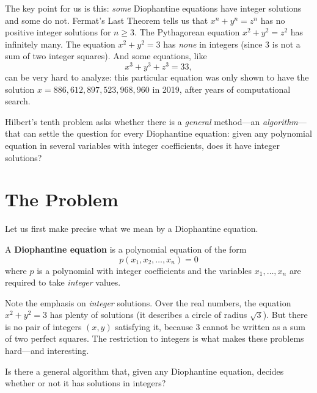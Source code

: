 The key point for us is this: \emph{some} Diophantine equations have integer solutions and some do not. Fermat's Last Theorem tells us that $x^n + y^n = z^n$ has no positive integer solutions for $n \geq 3$. The Pythagorean equation $x^2 + y^2 = z^2$ has infinitely many. The equation $x^2 + y^2 = 3$ has \emph{none} in integers (since $3$ is not a sum of two integer squares). And some equations, like
\[
    x^3 + y^3 + z^3 = 33,
\]
can be very hard to analyze: this particular equation was only shown to have the solution $x = 886{,}612{,}897{,}523{,}968{,}960$ in 2019, after years of computational search.

Hilbert's tenth problem asks whether there is a \emph{general} method---an \emph{algorithm}---that can settle the question for every Diophantine equation: given any polynomial equation in several variables with integer coefficients, does it have integer solutions?

\section{The Problem}

Let us first make precise what we mean by a Diophantine equation.

\begin{definition}
A \textbf{Diophantine equation} is a polynomial equation of the form
\[
    p(x_1, x_2, \ldots, x_n) = 0
\]
where $p$ is a polynomial with integer coefficients and the variables $x_1, \ldots, x_n$ are required to take \emph{integer} values.
\end{definition}

Note the emphasis on \emph{integer} solutions. Over the real numbers, the equation $x^2 + y^2 = 3$ has plenty of solutions (it describes a circle of radius $\sqrt{3}$). But there is no pair of integers $(x, y)$ satisfying it, because $3$ cannot be written as a sum of two perfect squares. The restriction to integers is what makes these problems hard---and interesting.

\begin{problem_statement}
Is there a general algorithm that, given any Diophantine equation, decides whether or not it has solutions in integers?
\end{problem_statement}

